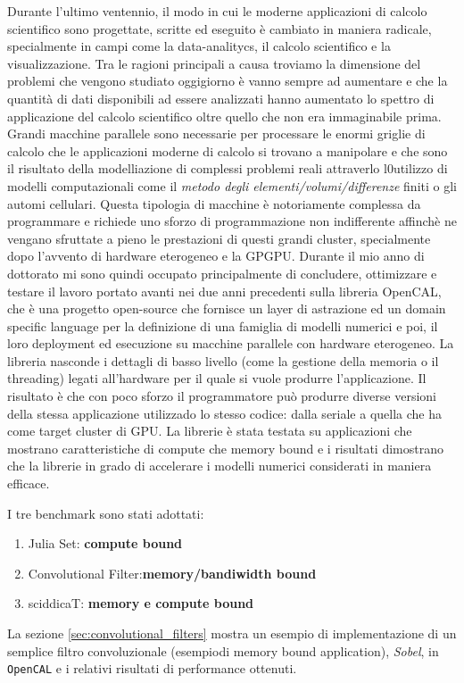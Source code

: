Durante l'ultimo ventennio, il modo in cui le moderne applicazioni di calcolo scientifico sono progettate, scritte ed eseguito è cambiato in maniera radicale, specialmente in campi come la data-analitycs, il calcolo scientifico e la visualizzazione.
Tra le ragioni principali a causa troviamo la dimensione del problemi che vengono studiato oggigiorno è vanno sempre ad aumentare e che la quantità di dati disponibili ad essere analizzati hanno aumentato lo spettro di applicazione del calcolo scientifico oltre quello che non era immaginabile prima.
Grandi macchine parallele sono necessarie per processare le enormi griglie di calcolo che le applicazioni moderne di calcolo si trovano a manipolare e che sono il risultato della modelliazione di complessi problemi reali attraverlo l0utilizzo di modelli computazionali come il \textit{metodo degli elementi/volumi/differenze}  finiti o gli automi cellulari.
Questa tipologia di macchine è notoriamente complessa da programmare e richiede uno sforzo di programmazione non indifferente affinchè ne vengano sfruttate a pieno le prestazioni di questi grandi cluster, specialmente dopo l'avvento di hardware eterogeneo e la GPGPU.
Durante il mio  anno di dottorato mi sono quindi occupato principalmente di concludere, ottimizzare e testare il lavoro  portato avanti nei due anni precedenti sulla libreria OpenCAL, che è una progetto open-source che fornisce un layer di astrazione ed un domain specific language per la definizione di una famiglia di modelli numerici e poi, il loro deployment ed esecuzione su macchine parallele con hardware eterogeneo.
La libreria nasconde i dettagli di basso livello (come la gestione della memoria o il threading) legati all'hardware per il quale si vuole produrre l'applicazione.
Il risultato è che con poco sforzo il programmatore può produrre diverse versioni della stessa applicazione utilizzado lo stesso codice: dalla seriale a quella che ha come target cluster di GPU.
La librerie è stata testata su applicazioni che mostrano  caratteristiche di compute che memory bound e i risultati dimostrano che la librerie  in grado di accelerare i modelli numerici considerati in maniera efficace.

I tre benchmark sono stati adottati:
\begin{enumerate}
	\item Julia Set: \textbf{compute bound}
	\item Convolutional Filter:\textbf{memory/bandiwidth bound}
	\item sciddicaT: \textbf{memory e compute bound}
\end{enumerate} 
La sezione \ref{sec:convolutional_filters} mostra un esempio di implementazione di un semplice filtro convoluzionale (esempiodi memory bound application), \textit{Sobel}, in \texttt{OpenCAL} e i relativi risultati di performance ottenuti.

